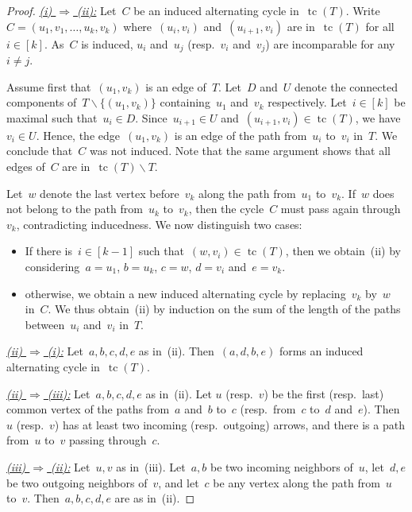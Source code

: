 \documentclass{amsart}
\theoremstyle{definition}
\newcommand{\ssm}{\smallsetminus} %
\DeclareMathOperator{\tc}{tc} %
\begin{document}
\begin{proof}
\uline{\textsl{(i) $\Rightarrow$ (ii):}}
Let~$C$ be an induced alternating cycle in~$\tc(T)$.
Write~$C = (u_1, v_1, \dots, u_k, v_k)$ where~$(u_i, v_i)$ and~$(u_{i+1}, v_i)$ are in~$\tc(T)$ for all~$i \in [k]$.
As~$C$ is induced, $u_i$ and~$u_j$ (resp.~$v_i$ and~$v_j$) are incomparable for any~$i \ne j$.

Assume first that~$(u_1, v_k)$ is an edge of~$T$.
Let~$D$ and~$U$ denote the connected components of~$T \ssm \{(u_1, v_k)\}$ containing~$u_1$ and~$v_k$ respectively.
Let~$i \in [k]$ be maximal such that~$u_i \in D$.
Since~$u_{i+1} \in U$ and~$(u_{i+1}, v_i) \in \tc(T)$, we have~$v_i \in U$.
Hence, the edge~$(u_1, v_k)$ is an edge of the path from~$u_i$ to~$v_i$ in~$T$.
We conclude that~$C$ was not induced.
Note that the same argument shows that all edges of~$C$ are in~$\tc(T) \ssm T$.

Let~$w$ denote the last vertex before~$v_k$ along the path from~$u_1$ to~$v_k$.
If~$w$ does not belong to the path from~$u_k$ to~$v_k$, then the cycle~$C$ must pass again through~$v_k$, contradicting inducedness.
We now distinguish two cases:
\begin{itemize}
\item If there is~$i \in [k-1]$ such that~$(w,v_i) \in \tc(T)$, then we obtain~(ii) by considering~$a = u_1$, $b = u_k$, $c = w$, $d = v_i$ and~$e = v_k$.
\item otherwise, we obtain a new induced alternating cycle by replacing~$v_k$ by~$w$ in~$C$. We thus obtain~(ii) by induction on the sum of the length of the paths between~$u_i$ and~$v_i$ in~$T$.
\qedhere
\end{itemize}

\medskip\noindent
\uline{\textsl{(ii) $\Rightarrow$ (i):}} Let~$a,b,c,d,e$ as in~(ii). Then~$(a,d,b,e)$ forms an induced alternating cycle in~$\tc(T)$.

\medskip\noindent
\uline{\textsl{(ii) $\Rightarrow$ (iii):}} Let~$a,b,c,d,e$ as in~(ii). Let $u$ (resp.~$v$) be the first (resp.~last) common vertex of the paths from~$a$ and~$b$ to~$c$ (resp.~from~$c$ to~$d$ and~$e$). Then~$u$ (resp.~$v$) has at least two incoming (resp.~outgoing) arrows, and there is a path from~$u$ to~$v$ passing through~$c$.

\medskip\noindent
\uline{\textsl{(iii) $\Rightarrow$ (ii):}} Let~$u,v$ as in~(iii). Let~$a,b$ be two incoming neighbors of~$u$, let~$d,e$ be two outgoing neighbors of~$v$, and let~$c$ be any vertex along the path from~$u$ to~$v$. Then~$a,b,c,d,e$ are as in~(ii).
\end{proof}
\end{document}
